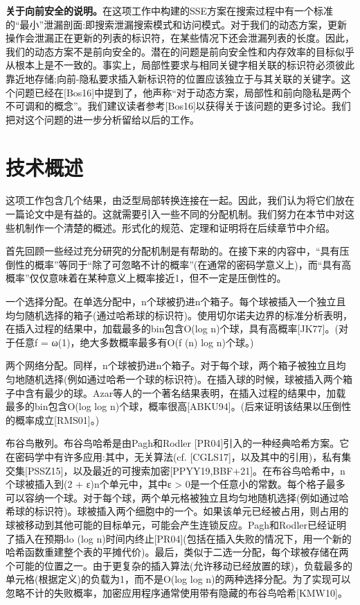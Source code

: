 \documentclass[UTF8]{article}
\begin{document}
\textbf{关于向前安全的说明。}在这项工作中构建的SSE方案在搜索过程中有一个标准的“最小”泄漏剖面:即搜索泄漏搜索模式和访问模式。对于我们的动态方案，更新操作会泄漏正在更新的列表的标识符，在某些情况下还会泄漏列表的长度。因此，我们的动态方案不是前向安全的。潜在的问题是前向安全性和内存效率的目标似乎从根本上是不一致的。事实上，局部性要求与相同关键字相关联的标识符必须彼此靠近地存储;向前-隐私要求插入新标识符的位置应该独立于与其关联的关键字。这个问题已经在[Bos16]中提到了，他声称“对于动态方案，局部性和前向隐私是两个不可调和的概念”。我们建议读者参考[Bos16]以获得关于该问题的更多讨论。我们把对这个问题的进一步分析留给以后的工作。
\section{技术概述}
这项工作包含几个结果，由泛型局部转换连接在一起。因此，我们认为将它们放在一篇论文中是有益的。这就需要引入一些不同的分配机制。我们努力在本节中对这些机制作一个清楚的概述。形式化的规范、定理和证明将在后续章节中介绍。

首先回顾一些经过充分研究的分配机制是有帮助的。在接下来的内容中，“具有压倒性的概率”等同于“除了可忽略不计的概率”(在通常的密码学意义上)，而“具有高概率”仅仅意味着在某种意义上概率接近1，但不一定是压倒性的。

一个选择分配。在单选分配中，n个球被扔进n个箱子。每个球被插入一个独立且均匀随机选择的箱子(通过哈希球的标识符)。使用切尔诺夫边界的标准分析表明，在插入过程的结果中，加载最多的bin包含O(log n)个球，具有高概率[JK77]。(对于任意f = ω(1)，绝大多数概率最多有O(f (n) log n)个球。)

两个网络分配。同样，n个球被扔进n个箱子。对于每个球，两个箱子被独立且均匀地随机选择(例如通过哈希一个球的标识符)。在插入球的时候，球被插入两个箱子中含有最少的球。Azar等人的一个著名结果表明，在插入过程的结果中，加载最多的bin包含O(log log n)个球，概率很高[ABKU94]。(后来证明该结果以压倒性的概率成立[RMS01]。)

布谷鸟散列。布谷鸟哈希是由Pagh和Rodler [PR04]引入的一种经典哈希方案。它在密码学中有许多应用:其中，无关算法(cf. [CGLS17]，以及其中的引用)，私有集交集[PSSZ15]，以及最近的可搜索加密[PPYY19,BBF+21]。在布谷鸟哈希中，n个球被插入到(2 + ε)n个单元中，其中ε > 0是一个任意小的常数。每个格子最多可以容纳一个球。对于每个球，两个单元格被独立且均匀地随机选择(例如通过哈希球的标识符)。球被插入两个细胞中的一个。如果该单元已经被占用，则占用的球被移动到其他可能的目标单元，可能会产生连锁反应。Pagh和Rodler已经证明了插入在预期do (log n)时间内终止[PR04](包括在插入失败的情况下，用一个新的哈希函数重建整个表的平摊代价)。最后，类似于二选一分配，每个球被存储在两个可能的位置之一。由于更复杂的插入算法(允许移动已经放置的球)，负载最多的单元格(根据定义)的负载为1，而不是O(log log n)的两种选择分配。为了实现可以忽略不计的失败概率，加密应用程序通常使用带有隐藏的布谷鸟哈希[KMW10]。
\end{document}
